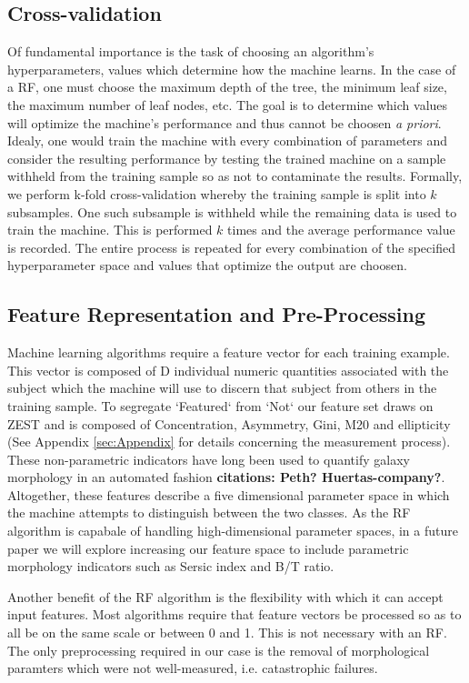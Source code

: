 \documentclass[twocolumn]{aastex6}
\begin{document}
\subsection{Cross-validation}
Of fundamental importance is the task of choosing an algorithm's hyperparameters, 
values which determine how the machine learns.  In the case of a RF, one must 
choose the maximum depth of the tree, the minimum leaf size, the maximum
number of leaf nodes, etc. The goal is to determine which values will optimize 
the machine's performance and thus cannot be choosen \textit{a priori}. 
Idealy, one would train the machine with every combination of parameters and 
consider the resulting performance by testing the trained machine on a sample
withheld from the training sample so as not to contaminate the results. 
Formally, we perform k-fold cross-validation whereby the training sample is split
into $k$ subsamples. One such subsample is withheld while the remaining data is
used to train the machine. This is performed $k$ times and the average performance
value is recorded. The entire process is repeated for every combination of the 
specified hyperparameter space and values that optimize the output are choosen. 

 
\subsection{Feature Representation and Pre-Processing}
Machine learning algorithms require a feature vector for each training example. 
This vector is composed of D individual numeric quantities associated with the 
subject which the machine will use to discern that subject from others in the 
training sample. To segregate `Featured` from `Not` our feature set draws 
on ZEST \citep{Scarlata2007} and  is composed of Concentration, Asymmetry, Gini, 
M20 and ellipticity (See Appendix \ref{sec:Appendix} for details concerning the 
measurement process). These non-parametric indicators have long been used to 
quantify galaxy morphology in an automated fashion \textbf{citations: Peth? Huertas-company?}. 
Altogether, these features describe a five dimensional parameter space in 
which the machine attempts to distinguish between the two classes. 
As the RF algorithm is capabale of handling high-dimensional parameter spaces, in
a future paper we will explore increasing our feature space to include parametric
morphology indicators such as Sersic index and B/T ratio. 

Another benefit of the RF algorithm is the flexibility with which it can accept input 
features. Most algorithms require that feature vectors be processed so as to all 
be on the same scale or between 0 and 1. This is not necessary with an RF. The only
preprocessing required in our case is the removal of morphological paramters which
were not well-measured, i.e. catastrophic failures. 
\end{document}
